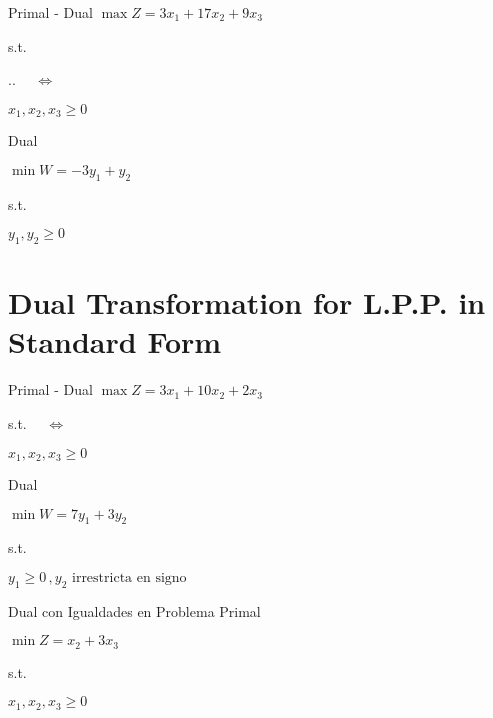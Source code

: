\begin{frameExample}{Primal - Dual}{}
  $  \max Z = 3x_1+ 17x_2 + 9x_3 $
  
  s.t.\vspace{5mm}


  \sysdelim..
$\quad \Leftrightarrow \quad$ 

$x_1, x_2, x_3  \geq 0 $
\vspace{5mm}

\begin{block}{Dual}
  
  $\min W = -3y_1 + y_2 $

                  s.t.  %
  
  $    y_1, y_2  \geq 0 $
\end{block}
\end{frameExample}


\section{Dual Transformation for L.P.P. in Standard Form}
\label{sec:standard-form}


\begin{frameExample}{Primal - Dual}{}
   $  \max Z = 3x_1+ 10x_2 + 2x_3 $
  
  s.t. $\quad \Leftrightarrow \quad$

$x_1, x_2, x_3  \geq 0 $
\vspace{3mm}
\begin{block}{Dual}
  
  $\min W = 7y_1 + 3y_2 $

                  s.t.  %
  
  $    y_1\geq 0 \, , y_2 \text{ irrestricta en signo}$
\end{block}
\end{frameExample}


\begin{frameExample}{Dual con Igualdades en Problema Primal}
  
  $\min Z = x_2 + 3x_3$

  s.t.


  $x_1, x_2, x_3 \geq 0$
\end{frameExample}

